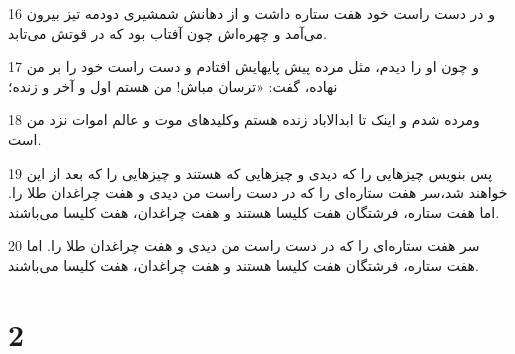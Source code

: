 \par 16 و در دست راست خود هفت ستاره داشت و از دهانش شمشیری دودمه تیز بیرون می‌آمد و چهره‌اش چون آفتاب بود که در قوتش می‌تابد.
\par 17 و چون او را دیدم، مثل مرده پیش پایهایش افتادم و دست راست خود را بر من نهاده، گفت: «ترسان مباش! من هستم اول و آخر و زنده؛
\par 18 ومرده شدم و اینک تا ابدالاباد زنده هستم وکلیدهای موت و عالم اموات نزد من است.
\par 19 پس بنویس چیزهایی را که دیدی و چیزهایی که هستند و چیزهایی را که بعد از این خواهند شد،سر هفت ستاره‌ای را که در دست راست من دیدی و هفت چراغدان طلا را. اما هفت ستاره، فرشتگان هفت کلیسا هستند و هفت چراغدان، هفت کلیسا می‌باشند.
\par 20 سر هفت ستاره‌ای را که در دست راست من دیدی و هفت چراغدان طلا را. اما هفت ستاره، فرشتگان هفت کلیسا هستند و هفت چراغدان، هفت کلیسا می‌باشند.

\chapter{2}

